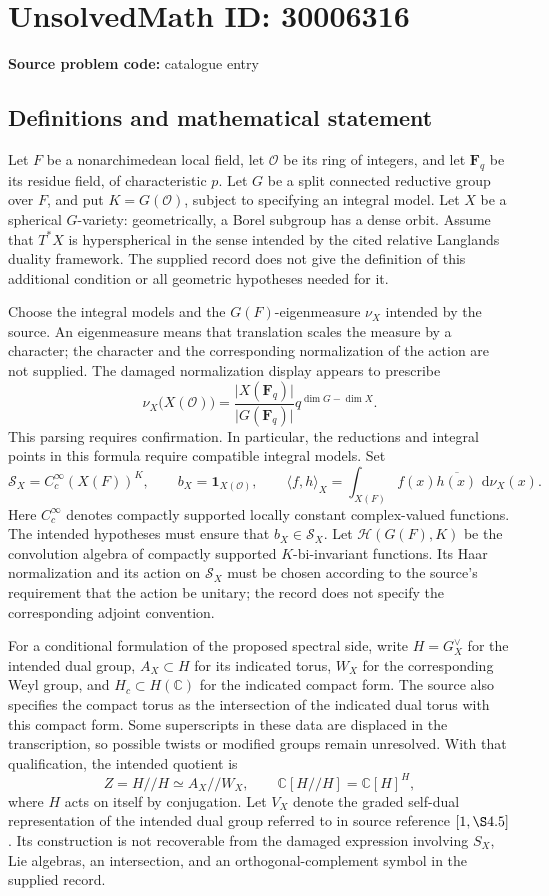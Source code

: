 \documentclass[11pt]{article}
\newcommand{\C}{\mathbb{C}}
\newcommand{\dd}{\,\mathrm{d}}
\begin{document}
\section*{UnsolvedMath ID: 30006316}
\textbf{Source problem code:} catalogue entry
\subsection{Definitions and mathematical statement}
Let \(F\) be a nonarchimedean local field, let \(\mathcal O\) be its ring of integers, and let \(\mathbf F_q\) be its residue field, of characteristic \(p\). Let \(G\) be a split connected reductive group over \(F\), and put \(K=G(\mathcal O)\), subject to specifying an integral model. Let \(X\) be a spherical \(G\)-variety: geometrically, a Borel subgroup has a dense orbit. Assume that \(T^*X\) is hyperspherical in the sense intended by the cited relative Langlands duality framework. The supplied record does not give the definition of this additional condition or all geometric hypotheses needed for it.

Choose the integral models and the \(G(F)\)-eigenmeasure \(\nu_X\) intended by the source. An eigenmeasure means that translation scales the measure by a character; the character and the corresponding normalization of the action are not supplied. The damaged normalization display appears to prescribe
\[
 \nu_X\bigl(X(\mathcal O)\bigr)
 =\frac{\lvert X(\mathbf F_q)\rvert}{\lvert G(\mathbf F_q)\rvert}
 q^{\dim G-\dim X}.
\]
This parsing requires confirmation. In particular, the reductions and integral points in this formula require compatible integral models. Set
\[
 \mathcal S_X=C_c^\infty(X(F))^K,
 \qquad b_X=\mathbf 1_{X(\mathcal O)},
 \qquad
 \langle f,h\rangle_X=\int_{X(F)}f(x)\overline{h(x)}\,\dd\nu_X(x).
\]
Here \(C_c^\infty\) denotes compactly supported locally constant complex-valued functions. The intended hypotheses must ensure that \(b_X\in\mathcal S_X\). Let \(\mathcal H(G(F),K)\) be the convolution algebra of compactly supported \(K\)-bi-invariant functions. Its Haar normalization and its action on \(\mathcal S_X\) must be chosen according to the source's requirement that the action be unitary; the record does not specify the corresponding adjoint convention.

For a conditional formulation of the proposed spectral side, write \(H=G_X^\vee\) for the intended dual group, \(A_X\subset H\) for its indicated torus, \(W_X\) for the corresponding Weyl group, and \(H_c\subset H(\C)\) for the indicated compact form. The source also specifies the compact torus as the intersection of the indicated dual torus with this compact form. Some superscripts in these data are displaced in the transcription, so possible twists or modified groups remain unresolved. With that qualification, the intended quotient is
\[
 Z=H\mathbin{//}H\simeq A_X\mathbin{//}W_X,
 \qquad
 \C[H\mathbin{//}H]=\C[H]^H,
\]
where \(H\) acts on itself by conjugation. Let \(V_X\) denote the graded self-dual representation of the intended dual group referred to in source reference \([1,\S4.5]\). Its construction is not recoverable from the damaged expression involving \(S_X\), Lie algebras, an intersection, and an orthogonal-complement symbol in the supplied record.
\end{document}
